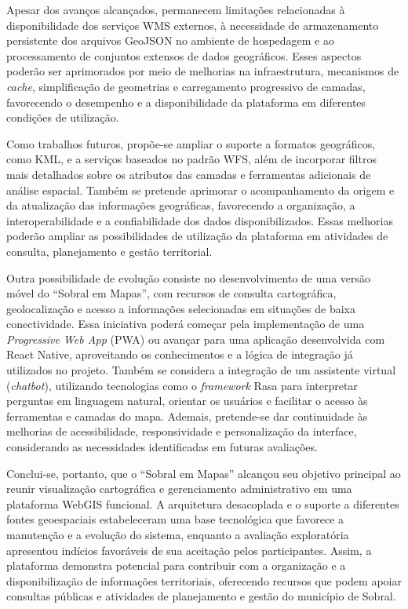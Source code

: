 Apesar dos avanços alcançados, permanecem limitações relacionadas à disponibilidade dos serviços WMS externos, à necessidade de armazenamento persistente dos arquivos GeoJSON no ambiente de hospedagem e ao processamento de conjuntos extensos de dados geográficos. Esses aspectos poderão ser aprimorados por meio de melhorias na infraestrutura, mecanismos de \textit{cache}, simplificação de geometrias e carregamento progressivo de camadas, favorecendo o desempenho e a disponibilidade da plataforma em diferentes condições de utilização.

Como trabalhos futuros, propõe-se ampliar o suporte a formatos geográficos, como KML, e a serviços baseados no padrão WFS, além de incorporar filtros mais detalhados sobre os atributos das camadas e ferramentas adicionais de análise espacial. Também se pretende aprimorar o acompanhamento da origem e da atualização das informações geográficas, favorecendo a organização, a interoperabilidade e a confiabilidade dos dados disponibilizados. Essas melhorias poderão ampliar as possibilidades de utilização da plataforma em atividades de consulta, planejamento e gestão territorial.

Outra possibilidade de evolução consiste no desenvolvimento de uma versão móvel do ``Sobral em Mapas'', com recursos de consulta cartográfica, geolocalização e acesso a informações selecionadas em situações de baixa conectividade. Essa iniciativa poderá começar pela implementação de uma \textit{Progressive Web App} (PWA) ou avançar para uma aplicação desenvolvida com React Native, aproveitando os conhecimentos e a lógica de integração já utilizados no projeto. Também se considera a integração de um assistente virtual (\textit{chatbot}), utilizando tecnologias como o \textit{framework} Rasa para interpretar perguntas em linguagem natural, orientar os usuários e facilitar o acesso às ferramentas e camadas do mapa. Ademais, pretende-se dar continuidade às melhorias de acessibilidade, responsividade e personalização da interface, considerando as necessidades identificadas em futuras avaliações.

Conclui-se, portanto, que o ``Sobral em Mapas'' alcançou seu objetivo principal ao reunir visualização cartográfica e gerenciamento administrativo em uma plataforma WebGIS funcional. A arquitetura desacoplada e o suporte a diferentes fontes geoespaciais estabeleceram uma base tecnológica que favorece a manutenção e a evolução do sistema, enquanto a avaliação exploratória apresentou indícios favoráveis de sua aceitação pelos participantes. Assim, a plataforma demonstra potencial para contribuir com a organização e a disponibilização de informações territoriais, oferecendo recursos que podem apoiar consultas públicas e atividades de planejamento e gestão do município de Sobral.

